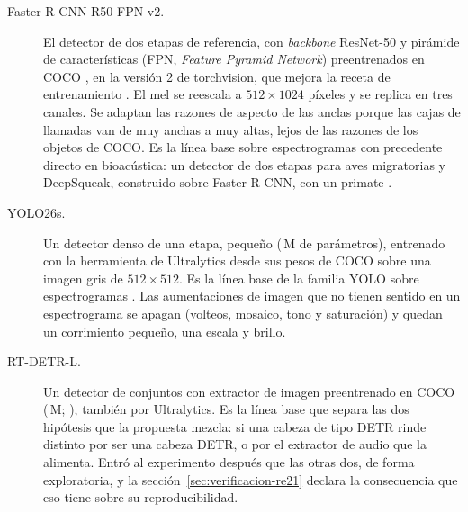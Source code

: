\begin{description}
    \item[Faster R-CNN R50-FPN v2.] El detector de dos etapas de referencia, con
        \textit{backbone} ResNet-50 y pirámide de características (FPN,
        \textit{Feature Pyramid Network}) preentrenados en COCO
        \citep{ren_faster_2017,he_deep_2016,lin_fpn_2017}, en la versión 2 de
        torchvision, que mejora la receta de entrenamiento
        \citep{li_benchmarking_2021}. El mel se reescala a $512 \times 1024$
        píxeles y se replica en tres canales. Se
        adaptan las razones de aspecto de las anclas porque las cajas de llamadas
        van de muy anchas a muy altas, lejos de las razones de los objetos de
        COCO. Es la línea base sobre espectrogramas con precedente directo en
        bioacústica: un detector de dos etapas para aves migratorias
        \citep{airale_nbm_2025} y DeepSqueak, construido sobre Faster R-CNN,
        con un primate \citep{romero-mujalli_utilizing_2021}.
    \item[YOLO26s.] Un detector denso de una etapa, pequeño
        (\cParamsYol{}\,M de parámetros), entrenado con la herramienta de
        Ultralytics \citep{jocher_yolo26_2026} desde sus pesos de COCO sobre una
        imagen gris de $512 \times 512$. Es la línea base de la familia YOLO
        sobre espectrogramas \citep{gonzalez_yolo-based_2025}. Las aumentaciones de
        imagen que no tienen sentido en un espectrograma se apagan (volteos,
        mosaico, tono y saturación) y quedan un corrimiento pequeño, una escala
        y brillo.
    \item[RT-DETR-L.] Un detector de conjuntos con extractor de imagen
        preentrenado en COCO (\cParamsRtd{}\,M; \citealp{zhao_rtdetr_2024}),
        también por Ultralytics. Es la
        línea base que separa las dos hipótesis que la propuesta mezcla: si una
        cabeza de tipo DETR rinde distinto por ser una cabeza DETR, o por el
        extractor de audio que la alimenta. Entró al experimento después que las
        otras dos, de forma exploratoria, y la
        sección~\ref{sec:verificacion-re21} declara la consecuencia que eso tiene
        sobre su reproducibilidad.
\end{description}

